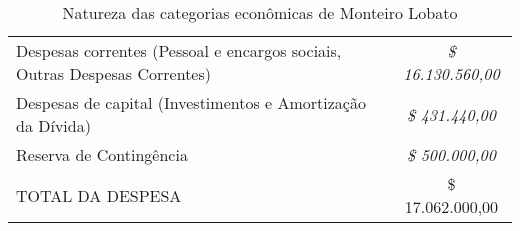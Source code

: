 \begin{table}[htbp]
	\centering
	\caption{Natureza das categorias econômicas de Monteiro Lobato}
	\begin{tabular}{p{19.455em}c}
		\rowcolor[rgb]{ .969,  .588,  .275} \textcolor[rgb]{ 1,  1,  1}{Despesas correntes (Pessoal e encargos sociais, Outras Despesas Correntes)} & \cellcolor[rgb]{ .992,  .914,  .851}\textit{ \$         16.130.560,00 } \\
		\rowcolor[rgb]{ .969,  .588,  .275} \textcolor[rgb]{ 1,  1,  1}{Despesas de capital (Investimentos e Amortização da Dívida)} & \cellcolor[rgb]{ .984,  .831,  .706}\textit{ \$              431.440,00 } \\
		\rowcolor[rgb]{ .969,  .588,  .275} \textcolor[rgb]{ 1,  1,  1}{Reserva de Contingência} & \cellcolor[rgb]{ .992,  .914,  .851}\textit{ \$              500.000,00 } \\
		\rowcolor[rgb]{ .969,  .588,  .275} \textcolor[rgb]{ 1,  1,  1}{TOTAL DA DESPESA} & \cellcolor[rgb]{ .984,  .831,  .706} \$      17.062.000,00  \\
	\end{tabular}%
	\label{tab:acoes_emerg}%
\end{table}%
